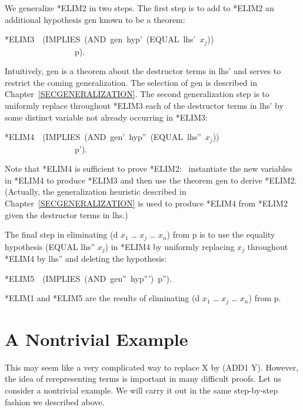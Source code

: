 \documentclass[11pt]{book}
\newenvironment{pubasis}{\begin{flushleft}\ttfamily\small}{\normalsize\rmfamily\end{flushleft}}
\newcommand{\pubdefaulttextsize}{\large}
\begin{document}
We generalize *ELIM2 in two steps.  The first step
is to add to *ELIM2 an additional hypothesis
gen known to be a theorem:
\begin{pubasis}
*ELIM3~~(IMPLIES~(AND~gen~hyp'~(EQUAL~lhs'~$x_{j}$))\\
~~~~~~~~~~~~~~~~~p).\\
\end{pubasis}
Intuitively, gen is a theorem about the destructor
terms in lhs' and serves to restrict the coming generalization.
The selection of gen is described in Chapter~\ref{SECGENERALIZATION}.
The second generalization step is to uniformly replace
throughout *ELIM3 each of the destructor terms in lhs'
by some distinct variable not already occurring in
*ELIM3:
\begin{pubasis}
*ELIM4~~(IMPLIES~(AND~gen'~hyp''~(EQUAL~lhs''~$x_{j}$))\\
~~~~~~~~~~~~~~~~~p').\\
\end{pubasis}
Note that *ELIM4 is sufficient to prove *ELIM2:~
instantiate the new variables in *ELIM4 to produce
*ELIM3 and then use the theorem gen to derive
*ELIM2.  (Actually, the generalization heuristic
described in Chapter~\ref{SECGENERALIZATION} is used to produce
*ELIM4 from *ELIM2 given the destructor terms
in lhs.) 

The final step in eliminating (d $x_{1}$ \ldots{} $x_{j}$ \ldots{} $x_{n}$)
from p is to use the equality hypothesis (EQUAL lhs'' $x_{j}$)
in *ELIM4 by uniformly replacing $x_{j}$  throughout *ELIM4 by lhs'' 
and deleting the hypothesis:
\begin{pubasis}
*ELIM5~~(IMPLIES~(AND~gen''~hyp''')~p'').\\
\end{pubasis}
*ELIM1 and *ELIM5 are the results of eliminating (d $x_{1}$ \ldots{} $x_{j}$ \ldots{} $x_{n}$) from p.
\section{A Nontrivial Example}
\pubdefaulttextsize
This may seem like a very complicated way to replace X by (ADD1 Y).
However, the idea of rerepresenting terms is important in many
difficult proofs.  Let us consider a nontrivial example.  We will
carry it out in the same step-by-step fashion we described above.
\end{document}
